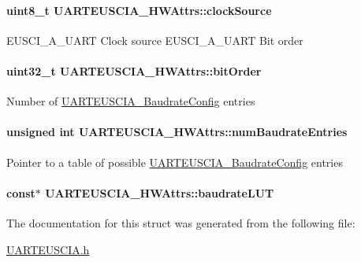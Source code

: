 \paragraph[{clock\+Source}]{\setlength{\rightskip}{0pt plus 5cm}uint8\+\_\+t U\+A\+R\+T\+E\+U\+S\+C\+I\+A\+\_\+\+H\+W\+Attrs\+::clock\+Source}\label{struct_u_a_r_t_e_u_s_c_i_a___h_w_attrs_a159323cc716d9d4fc0f5ece693f3d528}
E\+U\+S\+C\+I\+\_\+\+A\+\_\+\+U\+A\+R\+T Clock source E\+U\+S\+C\+I\+\_\+\+A\+\_\+\+U\+A\+R\+T Bit order 
\paragraph[{bit\+Order}]{\setlength{\rightskip}{0pt plus 5cm}uint32\+\_\+t U\+A\+R\+T\+E\+U\+S\+C\+I\+A\+\_\+\+H\+W\+Attrs\+::bit\+Order}\label{struct_u_a_r_t_e_u_s_c_i_a___h_w_attrs_a48aec31e8f3fb52f3474a00ba00b485b}
Number of \hyperlink{struct_u_a_r_t_e_u_s_c_i_a___baudrate_config}{U\+A\+R\+T\+E\+U\+S\+C\+I\+A\+\_\+\+Baudrate\+Config} entries 
\paragraph[{num\+Baudrate\+Entries}]{\setlength{\rightskip}{0pt plus 5cm}unsigned int U\+A\+R\+T\+E\+U\+S\+C\+I\+A\+\_\+\+H\+W\+Attrs\+::num\+Baudrate\+Entries}\label{struct_u_a_r_t_e_u_s_c_i_a___h_w_attrs_aba3f3da62966d8a0ea9956dafa74aea5}
Pointer to a table of possible \hyperlink{struct_u_a_r_t_e_u_s_c_i_a___baudrate_config}{U\+A\+R\+T\+E\+U\+S\+C\+I\+A\+\_\+\+Baudrate\+Config} entries 
\paragraph[{baudrate\+L\+U\+T}]{ const$\ast$ U\+A\+R\+T\+E\+U\+S\+C\+I\+A\+\_\+\+H\+W\+Attrs\+::baudrate\+L\+U\+T}\label{struct_u_a_r_t_e_u_s_c_i_a___h_w_attrs_a38c226d296905607c444d1d7ec2e04fe}


The documentation for this struct was generated from the following file\+:\begin{DoxyCompactItemize}
\item 
\hyperlink{_u_a_r_t_e_u_s_c_i_a_8h}{U\+A\+R\+T\+E\+U\+S\+C\+I\+A.\+h}\end{DoxyCompactItemize}
